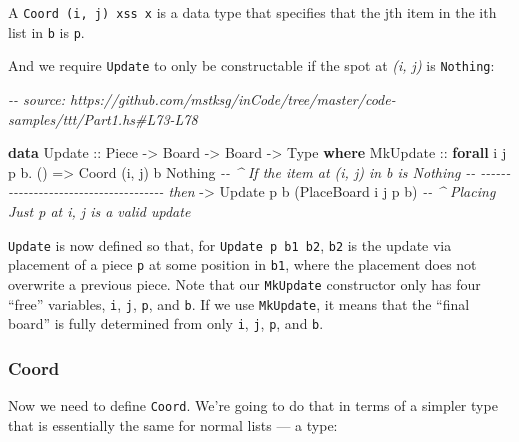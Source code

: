 \documentclass[]{article}
\newenvironment{Shaded}{}{}
\newcommand{\CommentTok}[1]{\textcolor[rgb]{0.38,0.63,0.69}{\textit{#1}}}
\newcommand{\DataTypeTok}[1]{\textcolor[rgb]{0.56,0.13,0.00}{#1}}
\newcommand{\KeywordTok}[1]{\textcolor[rgb]{0.00,0.44,0.13}{\textbf{#1}}}
\newcommand{\NormalTok}[1]{#1}
\newcommand{\OperatorTok}[1]{\textcolor[rgb]{0.40,0.40,0.40}{#1}}
\newcommand{\OtherTok}[1]{\textcolor[rgb]{0.00,0.44,0.13}{#1}}
\begin{document}
A \texttt{Coord\ \textquotesingle{}(i,\ j)\ xss\ x} is a data type that
specifies that the jth item in the ith list in \texttt{b} is \texttt{p}.

And we require \texttt{Update} to only be constructable if the spot at \emph{(i,
j)} is \texttt{Nothing}:

\begin{Shaded}
\begin{Highlighting}[]
\CommentTok{{-}{-} source: https://github.com/mstksg/inCode/tree/master/code{-}samples/ttt/Part1.hs\#L73{-}L78}

\KeywordTok{data} \DataTypeTok{Update}\OtherTok{ ::} \DataTypeTok{Piece} \OtherTok{{-}\textgreater{}} \DataTypeTok{Board} \OtherTok{{-}\textgreater{}} \DataTypeTok{Board} \OtherTok{{-}\textgreater{}} \DataTypeTok{Type} \KeywordTok{where}
    \DataTypeTok{MkUpdate}
\OtherTok{        ::} \KeywordTok{forall}\NormalTok{ i j p b}\OperatorTok{.}\NormalTok{ ()}
        \OtherTok{=\textgreater{}} \DataTypeTok{Coord}\NormalTok{ \textquotesingle{}(i, j) b }\DataTypeTok{\textquotesingle{}Nothing}         \CommentTok{{-}{-} \^{} If the item at (i, j) in b is Nothing}
        \CommentTok{{-}{-} {-}{-}{-}{-}{-}{-}{-}{-}{-}{-}{-}{-}{-}{-}{-}{-}{-}{-}{-}{-}{-}{-}{-}{-}{-}{-}{-}{-}{-}{-}{-}{-}{-}{-}{-}{-}{-} then}
        \OtherTok{{-}\textgreater{}} \DataTypeTok{Update}\NormalTok{ p b (}\DataTypeTok{PlaceBoard}\NormalTok{ i j p b)  }\CommentTok{{-}{-} \^{} Placing \textasciigrave{}Just p\textasciigrave{} at i, j is a valid update}
\end{Highlighting}
\end{Shaded}

\texttt{Update} is now defined so that, for \texttt{Update\ p\ b1\ b2},
\texttt{b2} is the update via placement of a piece \texttt{p} at some position
in \texttt{b1}, where the placement does not overwrite a previous piece. Note
that our \texttt{MkUpdate} constructor only has four ``free'' variables,
\texttt{i}, \texttt{j}, \texttt{p}, and \texttt{b}. If we use \texttt{MkUpdate},
it means that the ``final board'' is fully determined from only \texttt{i},
\texttt{j}, \texttt{p}, and \texttt{b}.

\subsubsection{Coord}\label{coord}

Now we need to define \texttt{Coord}. We're going to do that in terms of a
simpler type that is essentially the same for normal lists --- a type:
\end{document}
